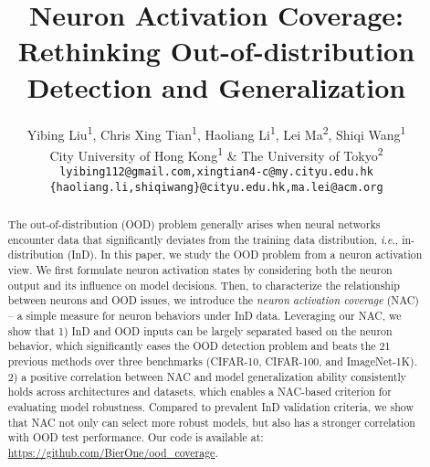 \documentclass{article} \usepackage{iclr2024_conference,times}
\title{Neuron Activation Coverage: Rethinking Out-of-distribution Detection and Generalization}
\author{Yibing Liu\textsuperscript{1}, Chris Xing Tian\textsuperscript{1}, Haoliang Li\textsuperscript{1}, Lei Ma\textsuperscript{2}, Shiqi Wang\textsuperscript{1} \\
City University of Hong Kong\textsuperscript{1} \&  The University of Tokyo\textsuperscript{2}\\
\texttt{lyibing112@gmail.com,xingtian4-c@my.cityu.edu.hk}\\
\texttt{\{haoliang.li,shiqiwang\}@cityu.edu.hk,ma.lei@acm.org}\\
}
\newcommand{\ie}{\textit{i}.\textit{e}.}
\begin{document}
\maketitle
\vspace{-2mm}
   
\begin{abstract}




	
	
	


	











	The out-of-distribution (OOD) problem generally arises when neural networks encounter data that significantly deviates from the training data distribution, \ie, in-distribution (InD).
	In this paper, we study the OOD problem from a neuron activation view. 
	We first formulate neuron activation states by considering both the neuron output and its influence on model decisions. 
	Then, to characterize the relationship between neurons and OOD issues, we introduce the \textit{neuron activation coverage} (NAC) -- a simple measure for neuron behaviors under InD data.
	Leveraging our NAC, we show that 1) InD and OOD inputs can be largely separated based on the neuron behavior, which significantly eases the OOD detection problem and beats the 21 previous methods over three benchmarks (CIFAR-10, CIFAR-100, and ImageNet-1K).
	2) a positive correlation between NAC and model generalization ability consistently holds across architectures and datasets, which enables a NAC-based criterion for evaluating model robustness.
	Compared to prevalent InD validation criteria, we show that NAC not only can select more robust models, but also has a stronger correlation with OOD test performance. Our code is available at: \url{https://github.com/BierOne/ood_coverage}.

\end{abstract}



\vspace{-1mm}
\end{document}

